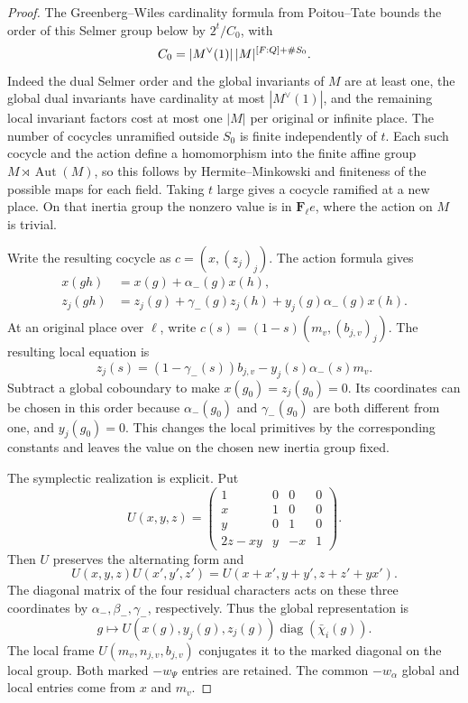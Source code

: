 \begin{proof}
The Greenberg--Wiles
cardinality formula from Poitou--Tate bounds the order
of this Selmer group below by \(2^t/C_0\), with
\[
 C_0=|M^\vee(1)|\,|M|^{[F:Q]+\#S_0}.
\]
Indeed the dual Selmer order and the global invariants
of \(M\) are at least one, the global dual invariants
have cardinality at most \(|M^\vee(1)|\), and the
remaining local invariant factors cost at most one
\(|M|\) per original or infinite place. The number of
cocycles unramified outside \(S_0\) is finite independently
of \(t\). Each such cocycle and the action define a
homomorphism into the finite affine group
\(M\rtimes\operatorname{Aut}(M)\), so this follows by
Hermite--Minkowski and finiteness of the possible maps
for each field. Taking \(t\) large gives a cocycle
ramified at a new place. On that inertia group the
nonzero value is in \(\mathbf F_\ell e\), where the
action on \(M\) is trivial.

Write the resulting cocycle as \(c=(x,(z_j)_j)\).
The action formula gives
\[
\begin{split}
 x(gh)&=x(g)+\alpha_-(g)x(h),\\
 z_j(gh)&=z_j(g)+\gamma_-(g)z_j(h)
                 +y_j(g)\alpha_-(g)x(h).
\end{split}
\]
At an original place over \(\ell\), write \(c(s)=
(1-s)(m_v,(b_{j,v})_j)\). The resulting local equation is
\[
 z_j(s)=(1-\gamma_-(s))b_{j,v}
                  -y_j(s)\alpha_-(s)m_v .
\]
Subtract a global coboundary to make
\(x(g_0)=z_j(g_0)=0\). Its coordinates can be chosen in
this order because \(\alpha_-(g_0)\) and \(\gamma_-(g_0)\)
are both different from one, and \(y_j(g_0)=0\).
This changes the local primitives by the corresponding
constants and leaves the value on the chosen
new inertia group fixed.

The symplectic realization is explicit. Put
\[
 U(x,y,z)=
 \begin{pmatrix}
 1&0&0&0\\ x&1&0&0\\ y&0&1&0\\ 2z-xy&y&-x&1
 \end{pmatrix}.
\]
Then \(U\) preserves the alternating form and
\[
 U(x,y,z)U(x',y',z')=
 U(x+x',y+y',z+z'+yx').
\]
The diagonal matrix of the four residual characters
acts on these three coordinates by
\(\alpha_-,\beta_-,\gamma_-\), respectively. Thus the
global representation is
\[
 g\longmapsto
 U(x(g),y_j(g),z_j(g))\operatorname{diag}(\bar\chi_i(g)).
\]
The local frame
\(U(m_v,n_{j,v},b_{j,v})\) conjugates it to the marked
diagonal on the local group. Both marked \(-w_\Psi\)
entries are retained. The common \(-w_\alpha\) global
and local entries come from \(x\) and \(m_v\).


\end{proof}
